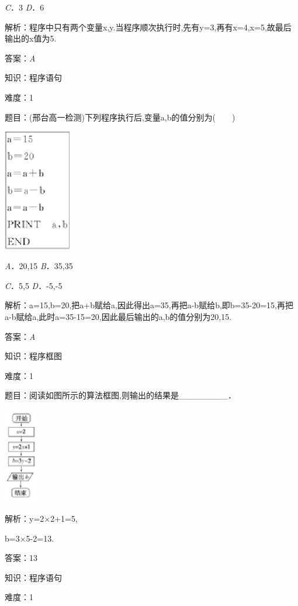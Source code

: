 \documentclass{article} %
\begin{document}
\textit{C}．3  \textit{D}．6

解析：程序中只有两个变量x,y.当程序顺次执行时,先有y=3,再有x=4,x=5,故最后输出的x值为5.

答案：\textit{A}

知识：程序语句

难度：1

题目：(邢台高一检测)下列程序执行后,变量a,b的值分别为(　　)

\includegraphics*[width=1.19in, height=2.11in, keepaspectratio=false]{image31}

\textit{A}．20,15  \textit{B}．35,35

\textit{C}．5,5    \textit{D}．-5,-5

解析：a=15,b=20,把a+b赋给a,因此得出a=35,再把a-b赋给b,即b=35-20=15,再把a-b赋给a,此时a=35-15=20,因此最后输出的a,b的值分别为20,15.

答案：\textit{A}

知识：程序框图

难度：1

题目：阅读如图所示的算法框图,则输出的结果是\_\_\_\_\_\_\_\_．



\includegraphics*[width=0.58in, height=1.65in, keepaspectratio=false]{image32}

解析：y=2$\mathrm{\times}$2+1=5,

b=3$\mathrm{\times}$5-2=13.

答案：13

知识：程序语句

难度：1
\end{document}
